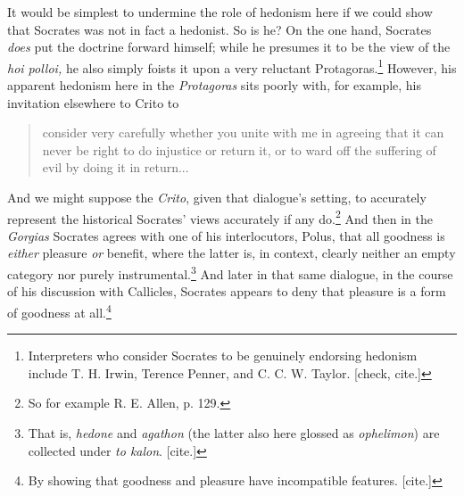 \documentclass[11pt]{amsart}
\begin{document}
It would be simplest to undermine the role of hedonism here if we could show that Socrates was not in fact a hedonist. So is he? On the one hand, Socrates \emph{does} put the doctrine forward himself; while he presumes it to be the view of the \emph{hoi polloi,} he also simply foists it upon a very reluctant Protagoras.\footnote{Interpreters who consider Socrates to be genuinely endorsing hedonism include T. H. Irwin, Terence Penner, and C. C. W. Taylor. [check, cite.]} However, his apparent hedonism here in the \emph{Protagoras} sits poorly with, for example, his invitation elsewhere to Crito to \begin{quote}consider very carefully whether you unite with me in agreeing that it can never be right to do injustice or return it, or to ward off the suffering of evil by doing it in return...\end{quote} And we might suppose the \emph{Crito}, given that dialogue's setting, to accurately represent the historical Socrates' views accurately if any do.\footnote{So for example R. E. Allen, p. 129.} And then in the \emph{Gorgias} Socrates agrees with one of his interlocutors, Polus, that all goodness is \emph{either} pleasure \emph{or} benefit, where the latter is, in context, clearly neither an empty category nor purely instrumental.\footnote{That is, \emph{hedone} and \emph{agathon} (the latter also here glossed as \emph{ophelimon}) are collected under \emph{to kalon}. [cite.]} And later in that same dialogue, in the course of his discussion with Callicles, Socrates appears to deny that pleasure is a form of goodness at all.\footnote{By showing that goodness and pleasure have incompatible features. [cite.]}
\end{document}

